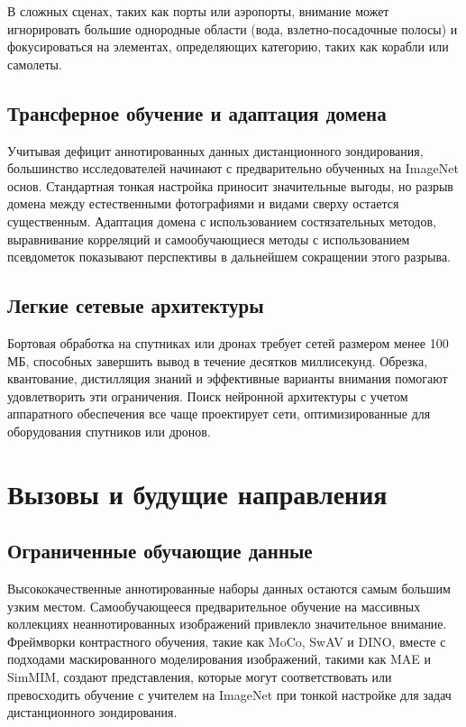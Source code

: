 \documentclass[12pt,a4paper]{article}
\begin{document}
В сложных сценах, таких как порты или аэропорты, внимание может игнорировать большие однородные области (вода, взлетно-посадочные полосы) и фокусироваться на элементах, определяющих категорию, таких как корабли или самолеты.

\subsection{Трансферное обучение и адаптация домена}
Учитывая дефицит аннотированных данных дистанционного зондирования, большинство исследователей начинают с предварительно обученных на ImageNet основ. Стандартная тонкая настройка приносит значительные выгоды, но разрыв домена между естественными фотографиями и видами сверху остается существенным. Адаптация домена с использованием состязательных методов, выравнивание корреляций и самообучающиеся методы с использованием псевдометок показывают перспективы в дальнейшем сокращении этого разрыва.

\subsection{Легкие сетевые архитектуры}
Бортовая обработка на спутниках или дронах требует сетей размером менее 100 МБ, способных завершить вывод в течение десятков миллисекунд. Обрезка, квантование, дистилляция знаний и эффективные варианты внимания помогают удовлетворить эти ограничения. Поиск нейронной архитектуры с учетом аппаратного обеспечения все чаще проектирует сети, оптимизированные для оборудования спутников или дронов.

\section{Вызовы и будущие направления}
\label{sec:challenges}
\subsection{Ограниченные обучающие данные}
Высококачественные аннотированные наборы данных остаются самым большим узким местом. Самообучающееся предварительное обучение на массивных коллекциях неаннотированных изображений привлекло значительное внимание. Фреймворки контрастного обучения, такие как MoCo, SwAV и DINO, вместе с подходами маскированного моделирования изображений, такими как MAE и SimMIM, создают представления, которые могут соответствовать или превосходить обучение с учителем на ImageNet при тонкой настройке для задач дистанционного зондирования.
\end{document}
